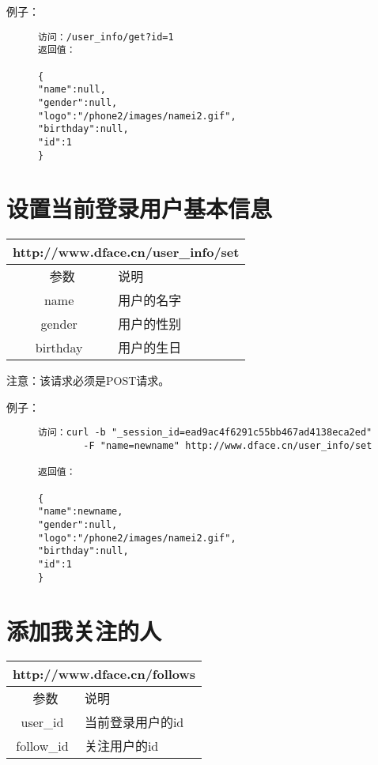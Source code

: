 \documentclass[cs4size]{ctexartutf8}
\begin{document}
例子：

\begin{figure}[H]
\begin{verbatim}
访问：/user_info/get?id=1
返回值：

{
"name":null,
"gender":null,
"logo":"/phone2/images/namei2.gif",
"birthday":null,
"id":1
}

\end{verbatim}
\end{figure}



\section{设置当前登录用户基本信息}

\begin{table}[H]
   \begin{center}
\begin{tabular}{|c|p{12cm}|}
\hline
\multicolumn{2}{|c|}{http://www.dface.cn/user\_info/set} \\
\hline\hline
 \  参数  &  说明  \\
\hline
 name  &  用户的名字\\
\hline
 gender  &  用户的性别\\
\hline
 birthday  &  用户的生日\\
\hline
\end{tabular}
   \end{center}
\end{table}

注意：该请求必须是POST请求。

例子：

\begin{figure}[H]
\begin{verbatim}
访问：curl -b "_session_id=ead9ac4f6291c55bb467ad4138eca2ed" 
        -F "name=newname" http://www.dface.cn/user_info/set

返回值：

{
"name":newname,
"gender":null,
"logo":"/phone2/images/namei2.gif",
"birthday":null,
"id":1
}

\end{verbatim}
\end{figure}



\section{添加我关注的人}

\begin{table}[H]
   \begin{center}
\begin{tabular}{|c|p{12cm}|}
\hline
\multicolumn{2}{|c|}{http://www.dface.cn/follows} \\
\hline\hline
 \  参数  &  说明  \\
\hline
 user\_id  &  当前登录用户的id\\
\hline
 follow\_id  &  关注用户的id\\
\hline
\end{tabular}
   \end{center}
\end{table}
\end{document}
